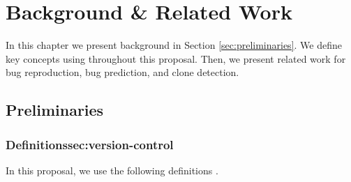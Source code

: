 
\chapter{Background \& Related Work\label{chap:relwork}}

In this chapter we present background  in Section \ref{sec:preliminaries}. We define key concepts using throughout this proposal.
Then, we present related work for bug reproduction, bug prediction, and clone detection.

\section{Preliminaries\label{sec:preliminaries}}

\subsection{Definitions{sec:version-control}}
In this proposal, we use the following definitions \cite{Avizienis2004,Pratt2001,Burnstein2006,Radatz1990,Whittaker2012}.

